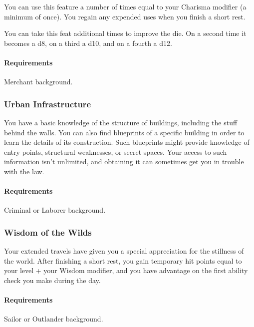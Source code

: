     You can use this feature a number of times equal to your Charisma modifier (a minimum of once).
    You regain any expended uses when you finish a short rest.

    You can take this feat additional times to improve the die.
    On a second time it becomes a d8, on a third a d10, and on a fourth a d12.
    \paragraph{Requirements} Merchant background.
\subsubsection{Urban Infrastructure} \label{feat::urbaninfrastructure}
    You have a basic knowledge of the structure of buildings, including the stuff behind the walls.
    You can also find blueprints of a specific building in order to learn the details of its construction.
    Such blueprints might provide knowledge of entry points, structural weaknesses, or secret spaces.
    Your access to such information isn't unlimited, and obtaining it can sometimes get you in trouble with the law.
    \paragraph{Requirements} Criminal or Laborer background.
\subsubsection{Wisdom of the Wilds} \label{feat::wisdomofthewilds}
    Your extended travels have given you a special appreciation for the stillness of the world.
    After finishing a short rest, you gain temporary hit points equal to your level + your Wisdom modifier, and you have advantage on the first ability check you make during the day.
    \paragraph{Requirements} Sailor or Outlander background.

\newpage
